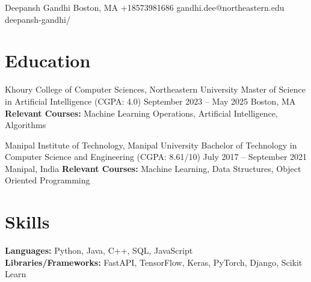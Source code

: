 \documentclass[letterpaper]{resume_config}
\begin{document}
\Header
    {Deepansh Gandhi
    \vspace{-1pt}} %
    {Boston, MA} %
    {+18573981686} %
    {gandhi.dee@northeastern.edu} %
    {deepansh-gandhi/} %
    \vspace{3pt}
    \begin{center}
    \vspace{-16pt}
    \end{center}


\vspace{-20pt}

\section{Education}
\vspace{-1pt}
\EducationExperience
    {Khoury College of Computer Sciences, Northeastern University} %
    {Master of Science in Artificial Intelligence (CGPA: 4.0)} %
    {September 2023 -- May 2025} %
    {Boston, MA
    \vspace{-1pt}} %
    {\textbf{Relevant Courses:} Machine Learning Operations, Artificial Intelligence, Algorithms}
    {}

\vspace{-6pt}


\EducationExperience
    {Manipal Institute of Technology, Manipal University} %
    {Bachelor of Technology in Computer Science and Engineering (CGPA: 8.61/10)} %
    {July 2017 -- September 2021} %
    {Manipal, India
    \vspace{-1pt}} %
    {\textbf{Relevant Courses:} Machine Learning, Data Structures, Object Oriented Programming}
    {}
\vspace{-16pt}



\section{Skills}
\vspace{-1pt}
\noindent
\textbf{Languages:} Python, Java, C++, SQL, JavaScript\\
\noindent
\textbf{Libraries/Frameworks:} FastAPI, TensorFlow, Keras, PyTorch, Django, Scikit Learn
\end{document}
